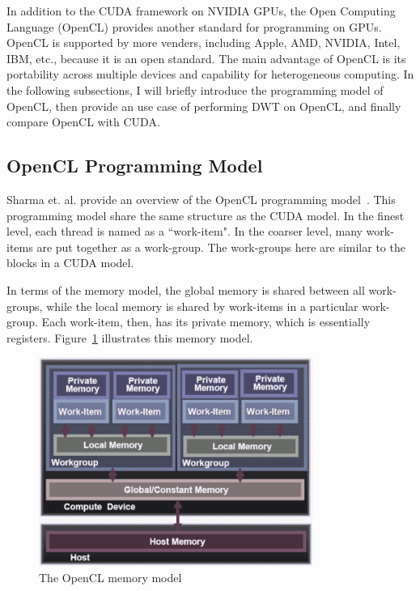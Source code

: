 In addition to the CUDA framework on NVIDIA GPUs, the Open Computing 
Language (OpenCL) provides another standard for programming on GPUs.
%
OpenCL is supported by more venders, including Apple, AMD, NVIDIA, Intel, 
IBM, etc., because it is an open standard.
%
The main advantage of OpenCL is its portability across multiple devices and 
capability for heterogeneous computing.
%
In the following subsections, I will briefly introduce the programming 
model of OpenCL, 
then provide an use case of performing DWT on OpenCL, 
and finally compare OpenCL with CUDA.


\subsection{OpenCL Programming Model}
\label{sec:opencl-model}
%
Sharma et. al. provide an overview of the OpenCL programming 
model~\cite{sharma2010parallel}.
%
This programming model share the same structure as the CUDA model.
%
In the finest level, each thread is named as a ``work-item".
%
In the coarser level, many work-items are put together as a 
work-group. 
%
The work-groups here are similar to the blocks in a CUDA model. 


In terms of the memory model, the global memory is shared between all
work-groups, while the local memory is shared by work-items in 
a particular work-group. 
%
Each work-item, then, has its private memory, which is essentially registers.
%
Figure~\ref{fig:opencl-model} illustrates this memory model.

\begin{figure}
    \centering
    \includegraphics[width=0.8\textwidth]{fig/opencl-model.png}
    \caption{The OpenCL memory model}
    \label{fig:opencl-model}
\end{figure}



